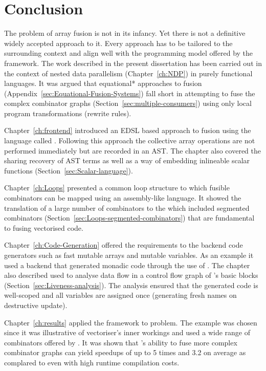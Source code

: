 \documentclass[preamble.tex]{subfiles}
\begin{document}
\clearpage

\chapter{Conclusion}

The problem of array fusion is not in its infancy. Yet there is not a definitive widely accepted approach to it. Every approach has to be tailored to the surrounding context and align well with the programming model offered by the framework. The work described in the present dissertation has been carried out in the context of nested data parallelism (Chapter~\ref{ch:NDP}) in purely functional languages. It was argued that \*equational* approaches to fusion (Appendix~\ref{sec:Equational-Fusion-Systems}) fall short in attempting to fuse the complex combinator graphs (Section~\ref{sec:multiple-consumers}) using only local program transformations (rewrite rules).

Chapter~\ref{ch:frontend} introduced an EDSL based approach to fusion using the language called \LiveFusion. Following this approach the collective array operations are not performed immediately but are recorded in an AST. The chapter also covered the sharing recovery of AST terms as well as a way of embedding inlineable scalar functions (Section~\ref{sec:Scalar-language}).

Chapter~\ref{ch:Loops} presented a common loop structure to which fusible combinators can be mapped using an assembly-like \Loop language. It showed the translation of a large number of combinators to the \Loop which included segmented combinators (Section~\ref{sec:Loops-segmented-combinators}) that are fundamental to fusing vectorised code.

Chapter~\ref{ch:Code-Generation} offered the requirements to the backend code generators such as fast mutable arrays and mutable variables. As an example it used a backend that generated monadic \Haskell code through the use of . The chapter also described  used to analyse data flow in a control flow graph of \Loop's basic blocks (Section~\ref{sec:Liveness-analysis}). The analysis ensured that the generated code is well-scoped and all variables are assigned once (generating fresh names on destructive update).

Chapter~\ref{ch:results} applied the \LiveFusion framework to \QuickHull problem. The example was chosen since it was illustrative of \DPH vectoriser's inner workings and used a wide range of combinators offered by \LiveFusion. It was shown that \LiveFusion's ability to fuse more complex combinator graphs can yield speedups of up to 5 times and 3.2 on average as complared to \StreamFusion even with high runtime compilation costs.


\IfNotCompilingAll{}
\end{document}
